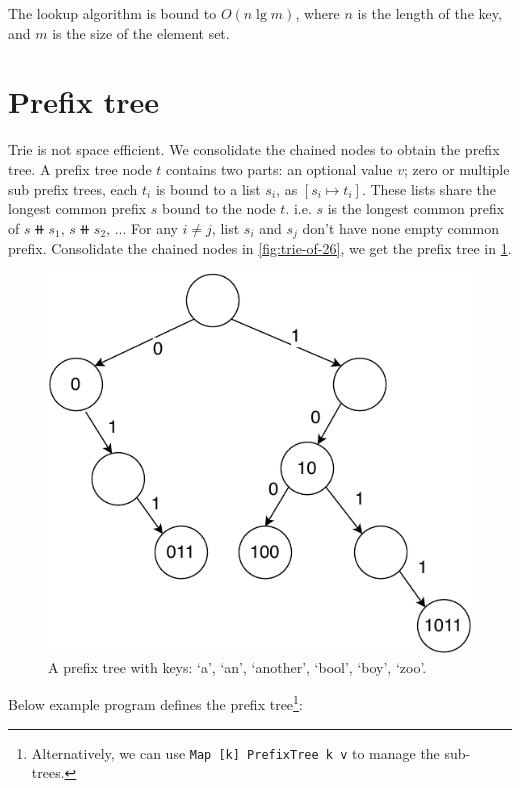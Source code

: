 \documentclass[b5paper]{article}
\begin{document}
The lookup algorithm is bound to $O(n \lg m)$, where $n$ is the length of the key, and $m$ is the size of the element set.

\section{Prefix tree}
 

Trie is not space efficient. We consolidate the chained nodes to obtain the prefix tree. A prefix tree node $t$ contains two parts: an optional value $v$; zero or multiple sub prefix trees, each $t_i$ is bound to a list $s_i$, as $[s_i \mapsto t_i]$. These lists share the longest common prefix $s$ bound to the node $t$. i.e. $s$ is the longest common prefix of $s \doubleplus s_1$, $s \doubleplus s_2$, ... For any $i \neq j$, list $s_i$ and $s_j$ don't have none empty common prefix. Consolidate the chained nodes in \cref{fig:trie-of-26}, we get the prefix tree in \cref{fig:patricia-tree}.

\begin{figure}[htbp]
  \centering
  \includegraphics[scale=0.6, page=10]{img/trie}
  \caption{A prefix tree with keys: `a', `an', `another', `bool', `boy', `zoo'.}
  \label{fig:patricia-tree}
\end{figure}

Below example program defines the prefix tree\footnote{Alternatively, we can use \texttt{Map [k] PrefixTree k v} to manage the sub-trees.}:
\end{document}
